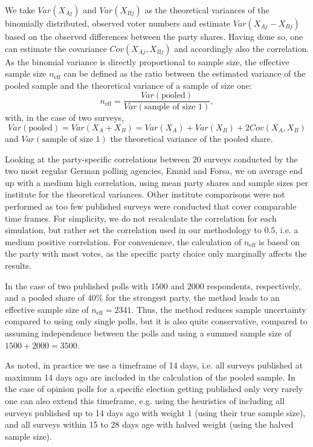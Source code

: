 \documentclass[smallcondensed]{svjour3}     %
\begin{document}
We take $Var(X_{Aj})$ and $Var(X_{Bj})$ as the theoretical variances of the binomially distributed, observed voter numbers and estimate $Var(X_{Aj} - X_{Bj})$ based on the observed differences between the party shares. Having done so, one can estimate the covariance $Cov(X_{Aj}, X_{Bj})$ and accordingly also the correlation. As the binomial variance is directly proportional to sample size, the effective sample size $n_{\text{eff}}$ can be defined as the ratio between the estimated variance of the pooled sample and the theoretical variance of a sample of size one:
$$
n_{\text{eff}} = \frac{Var(\text{pooled})}{Var(\text{sample of size 1})},
$$
with, in the case of two surveys,
$$
Var(\text{pooled}) = Var(X_A + X_B) = Var(X_A) + Var(X_B) + 2 Cov(X_A,X_B)
$$
and $Var(\text{sample of size 1})$ the theoretical variance of the pooled share.

Looking at the party-specific correlations between 20 surveys conducted by the two most regular German polling agencies, Emnid and Forsa, we on average end up with a medium high correlation, using mean party shares and sample sizes per institute for the theoretical variances. Other institute comparisons were not performed as too few published surveys were conducted that cover comparable time frames. For simplicity, we do not recalculate the correlation for each simulation, but rather set the correlation used in our methodology to $0.5$, i.e. a medium positive correlation.
For convenience, the calculation of $n_{\text{eff}}$ is based on the party with most votes, as the specific party choice only marginally affects the results.

In the case of two published polls with $1500$ and $2000$ respondents, respectively, and a pooled share of $40\%$
for the strongest party, the method leads
to an effective sample size of $n_{\text{eff}} = 2341$. Thus, the method reduces sample uncertainty
compared to using only single polls, but it is also quite conservative, compared to
assuming independence between the polls and using a summed sample size of $1500 + 2000 = 3500$.

As noted, in practice we use a timeframe of 14 days, i.e. all surveys published at maximum 14 days ago are included
in the calculation of the pooled sample. In the case of opinion polls for a specific election getting published
only very rarely one can also extend this timeframe, e.g. using the heuristics of including all surveys published up to 14 days
ago with weight 1 (using their true sample size), and all surveys within 15 to 28 days age with halved weight
(using the halved sample size).
\end{document}
